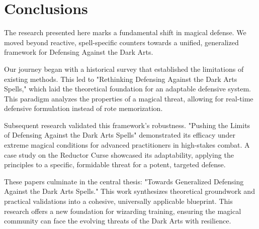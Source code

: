 \chapter{Conclusions}
The research presented here marks a fundamental shift in magical defense. We moved beyond reactive, spell-specific counters towards a unified, generalized framework for Defensing Against the Dark Arts.

Our journey began with a historical survey that established the limitations of existing methods. This led to "Rethinking Defensing Against the Dark Arts Spells," which laid the theoretical foundation for an adaptable defensive system. This paradigm analyzes the properties of a magical threat, allowing for real-time defensive formulation instead of rote memorization.

Subsequent research validated this framework's robustness. "Pushing the Limits of Defensing Against the Dark Arts Spells" demonstrated its efficacy under extreme magical conditions for advanced practitioners in high-stakes combat. A case study on the Reductor Curse showcased its adaptability, applying the principles to a specific, formidable threat for a potent, targeted defense.

These papers culminate in the central thesis: "Towards Generalized Defensing Against the Dark Arts Spells." This work synthesizes theoretical groundwork and practical validations into a cohesive, universally applicable blueprint. This research offers a new foundation for wizarding training, ensuring the magical community can face the evolving threats of the Dark Arts with resilience.